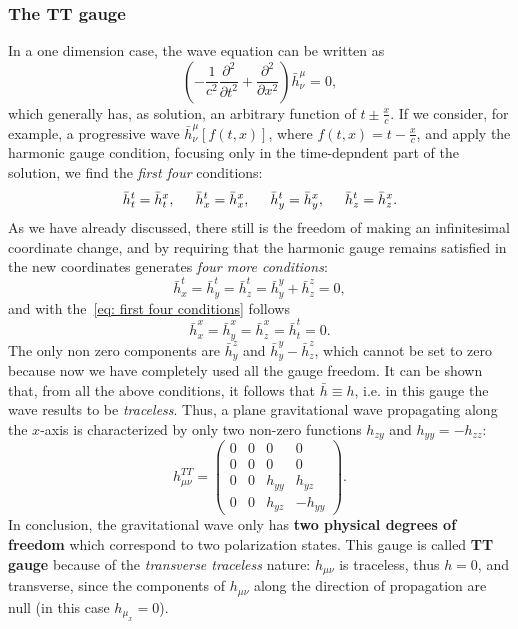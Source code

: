 \subsubsection{The TT gauge}
In a one dimension case, the wave equation can be written as
\[
    \left( -\frac{1}{c^2} \frac{\partial^2}{\partial t^2}  + \frac{\partial^2}{\partial x^2}\right)\bar{h}^\mu_\nu = 0,
\]
which generally has, as solution, an arbitrary function of $t\pm \frac{x}{c}$.
If we consider, for example, a progressive wave $\bar{h}^\mu_\nu [f(t,x)]$, where $f(t,x) = t- \frac{x}{c}$, and apply the harmonic gauge condition, focusing only in the time-depndent part of the solution, we find the \textit{first four} conditions:
\begin{equation}
    \bar{h}^t_t = \bar{h}^x_t, \hspace{5mm} \bar{h}^t_x = \bar{h}^x_x, \hspace{5mm} \bar{h}^t_y = \bar{h}^x_y, \hspace{5mm} \bar{h}^t_z = \bar{h}^x_z.
    \label{eq: first four conditions}
\end{equation}
As we have already discussed, there still is the freedom of making an infinitesimal coordinate change, and by requiring that the harmonic gauge remains satisfied in the new coordinates generates \textit{four more conditions}:
\begin{equation}
    \bar{h}^t_x = \bar{h}^t_y = \bar{h}^t_z = \bar{h}^y_y + \bar{h}^z_z = 0,
    \label{eq: second four conditions}
\end{equation}
and with the~\eqref{eq: first four conditions} follows
\[
     \bar{h}^x_x = \bar{h}^x_y = \bar{h}^x_z = \bar{h}^t_t = 0.
\]
The only non zero components are $\bar{h}^z_y$ and $\bar{h}^y_y - \bar{h}^z_z$, which cannot be set to zero because now we have completely used all the gauge freedom.
It can be shown that, from all the above conditions, it follows that $\bar{h} \equiv h$, i.e. in this gauge the wave results to be \textit{traceless}.
Thus, a plane gravitational wave propagating along the $x$-axis is characterized by only two non-zero functions $h_{zy}$ and $h_{yy}=-h_{zz}$:
\begin{equation}
    h^{TT}_{\mu\nu} =  
    \begin{pmatrix}
0 & 0 & 0 & 0 \\
0 & 0 & 0 & 0 \\
0 & 0 & h_{yy} & h_{yz} \\
0 & 0 & h_{yz} & -h_{yy}
\end{pmatrix}.
    \label{eq: h as a matrix in x case}
\end{equation}
In conclusion, the gravitational wave only has \textbf{two physical degrees of freedom} which correspond to two polarization states.
This gauge is called \textbf{TT gauge} because of the \textit{transverse traceless} nature: $h_{\mu\nu}$ is traceless, thus $h=0$, and transverse, since the components of $h_{\mu\nu}$ along the direction of propagation are null (in this case $h_{\mu_x}=0$).

